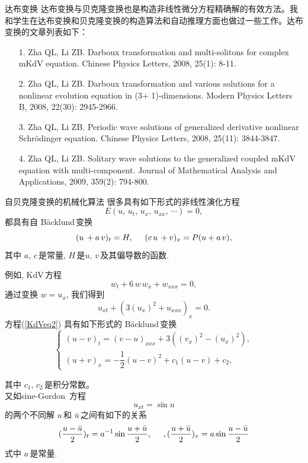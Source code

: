 \documentclass{beamer}
\begin{document}
\begin{frame}{达布变换}
  达布变换与贝克隆变换也是构造非线性微分方程精确解的有效方法。我和学生在达布变换和贝克隆变换的构造算法和自动推理方面也做过一些工作。达布变换的文章列表如下：
\begin{itemize}
  \item[1.] Zha QL, Li ZB. Darboux transformation and multi-solitons for complex mKdV equation. Chinese Physics Letters, 2008, 25(1): 8-11.
  \item[2.]	Zha QL, Li ZB. Darboux transformation and various solutions for a nonlinear evolution equation in (3+ 1)-dimensions. Modern Physics Letters B, 2008, 22(30): 2945-2966.
  \item[3.]	Zha QL, Li ZB. Periodic wave solutions of generalized derivative nonlinear Schrödinger equation. Chinese Physics Letters, 2008, 25(11): 3844-3847.
  \item[4.] Zha QL, Li ZB. Solitary wave solutions to the generalized coupled mKdV equation with multi-component. Journal of Mathematical Analysis and Applications, 2009, 359(2): 794-800.
\end{itemize}
\end{frame}
\begin{frame}{自贝克隆变换的机械化算法}
很多具有如下形式的非线性演化方程
\begin{equation}\label{eq344}
E(u,\,u_t,\,u_x,\,u_{xx},\,\cdots)=0,
\end{equation}
都具有自 B\"{a}cklund\,变换
\begin{equation}\label{eq345}
(u\,+ a\,v)_t = H,\hskip 0.5cm (c\,u\, + v)_x =P(u + a\,v),
\end{equation}
其中 $a,\,c$\,是常量, $H$\,是$u,\,v$\,及其偏导数的函数.

例如, KdV\,方程
\begin{equation}\label{KdV}
w_t+6\,w\,w_x+w_{xxx}=0,
\end{equation}
通过变换 $w=u_x$, 我们得到
\begin{equation}\label{KdVeq2}
u_{xt}+(3(u_x)^2+u_{xxx})_x=0.
\end{equation}
方程(\ref{KdVeq2}) 具有如下形式的 B\"{a}cklund\,变换
\begin{equation}\label{KdV_BT}
\left \{
\begin{array}{ll}
(u-v)_t=(v-u)_{xxx}+3((v_x)^2-(u_x)^2), \\[2mm]
(u+v)_x=-\dfrac{1}{2}(u-v)^2+c_1(u-v)+c_2,
\end{array}
\right.
\end{equation}
\end{frame}
\begin{frame}
其中 $c_1,\,c_2$\,是积分常数。\\[1mm]

又如sine-Gordon\, 方程
\[
  u_{xt} = \sin u
\]
的两个不同解 $u$\,和 $\bar{u}$\,之间有如下的关系
\begin{equation}
  (\dfrac{u-\bar{u}}{2})_t = a^{-1} \sin \dfrac{u + \bar{u}}{2}, \hskip 0.5cm , (\dfrac{u +\bar{u}}{2})_x = a \sin \dfrac{u-\bar{u}}{2}
\end{equation}
式中 $a$\,是常量.
\end{frame}
\end{document}
